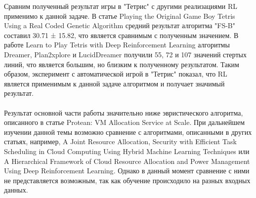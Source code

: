 \documentclass[draft]{article}
\begin{document}
Сравним полученный результат игры в "Тетрис" с другими реализациями RL применимо к данной задаче. В статье Playing the Original Game Boy Tetris Using a Real Coded Genetic Algorithm\cite{litlink7} средний результат алгоритма "FS-B" составил 30.71 ± 15.82, что является сравнимым с полученным значением. В работе Learn to Play Tetris with Deep Reinforcement Learning\cite{litlink20} алгоритмы Dreamer, Plan2xplore и LucidDreamer получили 55, 72 и 107 значений стертых линий, что является большим, но близким к полученному результатом. Таким образом, эксперимент с автоматической игрой в "Тетрис" показал, что RL является применимым к данной задаче алгоритмом и получает значимый результат.\\
~\\
Результат основной части работы значительно ниже эвристического алгоритма, описанного в статье Protean: VM Allocation Service at Scale\cite{litlink21}. При дальнейшем изучении данной темы возможно сравнение с алгоритмами, описанными в других статьях, например, A Joint Resource Allocation, Security with Efficient Task Scheduling in Cloud Computing Using Hybrid Machine Learning Techniques\cite{litlink23} или A Hierarchical Framework of Cloud Resource Allocation and Power Management Using Deep Reinforcement Learning\cite{litlink24}. Однако в данный момент сравнение с ними не представляется возможным, так как обучение происходило на разных входных данных.
\newpage
\end{document}
